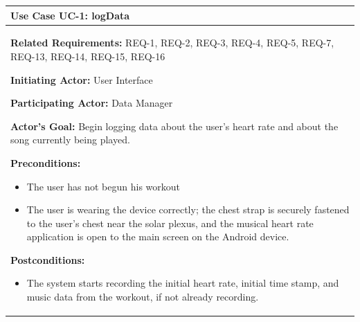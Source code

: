 \documentclass[letterpaper,english, 12pt]{scrreprt}
\begin{document}
\begin{center}
        \begin{longtable}{|C{15cm}|}
                \hline
                        \textbf{Use Case UC-1: logData}\\
                \hline
                        \begin{flushleft}
                                \textbf{Related Requirements: } REQ-1, REQ-2, REQ-3, REQ-4, REQ-5, REQ-7, REQ-13, REQ-14, REQ-15, REQ-16
                        \end{flushleft}
                        \begin{flushleft}
                                \textbf{Initiating Actor: } User Interface
                        \end{flushleft}
                        \begin{flushleft}
                                \textbf{Participating Actor: } Data Manager
                        \end{flushleft}
                        \begin{flushleft}
                                \textbf{Actor's Goal: } Begin logging data about the user's heart rate and about the song currently being played.
                        \end{flushleft}
                        \begin{flushleft}
                                \textbf{Preconditions: }
                        \end{flushleft}
                                \begin{itemize}
                                        \item The user has not begun his workout
                                        \item The user is wearing the device correctly; the chest strap is securely fastened to the user's chest near the solar plexus, and the musical heart rate application is open to the main screen on the Android device.
                                \end{itemize}
                        \begin{flushleft}
                                \textbf{Postconditions: }
                        \end{flushleft}
                                \begin{itemize}
                                        \item The system starts recording the initial heart rate, initial time stamp, and music data from the workout, if not already recording.

\end{itemize}
\end{longtable}
\end{center}
\end{document}
